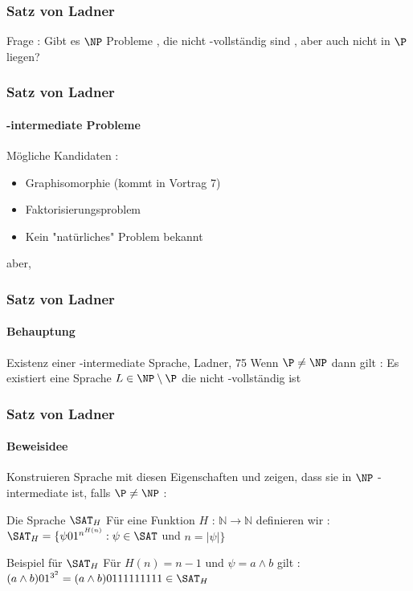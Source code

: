 \begin{frame}
	\frametitle{Satz von Ladner}
	Frage : Gibt es $\NP$  Probleme , die nicht \NP -vollständig sind , aber auch
	nicht in $\P$  liegen?
\end{frame}
\begin{frame}
	\frametitle{Satz von Ladner}
	\framesubtitle{\NP -intermediate Probleme}
	Mögliche Kandidaten :
	\begin{itemize}
	\item Graphisomorphie (kommt in Vortrag 7)
	\item Faktorisierungsproblem
	\item Kein "natürliches" Problem bekannt
	\end{itemize}
	
	aber,
\end{frame}

\begin{frame}
	\frametitle{Satz von Ladner}
	\framesubtitle{Behauptung}
	\begin{KITinfoblock}{Existenz einer \NP -intermediate Sprache, Ladner, 75}
	Wenn $\P \neq \NP$ dann gilt : \newline
	Es existiert eine Sprache $L \in \NP \setminus \P$ die nicht \NP -vollständig ist
	\end{KITinfoblock}
\end{frame}
\begin{frame}
	\frametitle{Satz von Ladner}
	\framesubtitle{Beweisidee}
	Konstruieren Sprache mit diesen Eigenschaften und zeigen, dass sie in $\NP$ -
	intermediate ist, falls $\P \neq \NP$  :
	
	\bigskip
	\pause
	\begin{KITinfoblock}{Die Sprache ${\SAT}_H$}
		Für eine Funktion $H$ : $\mathbb{N} \rightarrow \mathbb{N}$ definieren wir : \newline 	
		${\SAT}_H = \lbrace \psi 01^{n^{H(n)}} : \psi \in \SAT$ und $ n = |\psi| \rbrace$
	\end{KITinfoblock}
	\bigskip
	\pause	
	
	\begin{KITexampleblock}{Beispiel für ${\SAT}_H$}
	F\"ur $H(n) = n - 1$ und $\psi = a \land b$ gilt : \newline
	$(a \land b) 01^{3^2} = (a \land b) 0111111111 \in {\SAT}_H $
	\end{KITexampleblock}
\end{frame}

